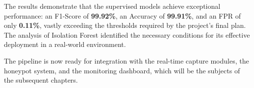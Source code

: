 The results demonstrate that the supervised models achieve exceptional performance: an F1-Score of \textbf{99.92\%}, an Accuracy of \textbf{99.91\%}, and an FPR of only \textbf{0.11\%}, vastly exceeding the thresholds required by the project's final plan. The analysis of Isolation Forest identified the necessary conditions for its effective deployment in a real-world environment.

The pipeline is now ready for integration with the real-time capture modules, the honeypot system, and the monitoring dashboard, which will be the subjects of the subsequent chapters.
